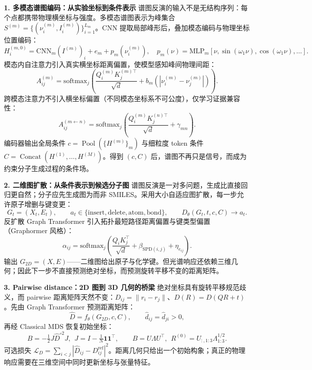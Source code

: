 \documentclass[10pt,a4paper]{ctexart}
\begin{document}
\textbf{1. 多模态谱图编码：从实验坐标到条件表示} \quad
谱图反演的输入不是无结构序列：每个点都携带物理横坐标与强度。多模态谱图表示为峰集合 $S^{(m)}=\{(\nu_i^{(m)},I_i^{(m)})\}_{i=1}^{L_m}$。CNN 提取局部峰形后，叠加模态编码与物理坐标位置编码：
\[
H_i^{(m,0)} = \mathrm{CNN}_m(I^{(m)})_i + e_m + p_m(\nu_i^{(m)}),\quad
p_m(\nu) = \mathrm{MLP}_m[\nu,\sin(\omega_1\nu),\cos(\omega_1\nu),\ldots].
\]
模态内自注意力引入真实横坐标距离偏置，使模型感知峰间物理间距：
\[
A_{ij}^{(m)} = \mathrm{softmax}_j\!\left(\frac{Q_i^{(m)}K_j^{(m)\top}}{\sqrt d} + b_m(|\nu_i^{(m)}-\nu_j^{(m)}|)\right).
\]
跨模态注意力不引入横坐标偏置（不同模态坐标系不可公度），仅学习证据兼容性：
\[
A_{ij}^{(m\leftarrow n)} = \mathrm{softmax}_j\!\left(\frac{Q_i^{(m)}K_j^{(n)\top}}{\sqrt d} + \gamma_{mn}\right).
\]
编码器输出全局条件 $c = \operatorname{Pool}(\{H^{(m)}\}_m)$ 与细粒度 token 条件 $C = \operatorname{Concat}(H^{(1)},\ldots,H^{(M)})$。得到 $(c,C)$ 后，谱图不再只是信号，而成为约束分子生成过程的条件场。

\textbf{2. 二维图扩散：从条件表示到候选分子图} \quad
谱图反演是一对多问题，生成比直接回归更自然；分子应先生成图为而非 SMILES。采用大小自适应图扩散，每一步允许原子增删与键变更：
\[
G_t = (X_t, E_t),\qquad a_t \in \{\mathrm{insert},\mathrm{delete},\mathrm{atom},\mathrm{bond}\},\qquad
D_\theta(G_t, t, c, C) \rightarrow a_t.
\]
反扩散 Graph Transformer 引入拓扑最短路径距离偏置与键类型偏置（Graphormer 风格）：
\[
\alpha_{ij} = \mathrm{softmax}_j\!\left(\frac{Q_iK_j^\top}{\sqrt d} + \beta_{\mathrm{SPD}(i,j)} + \eta_{e_{ij}}\right).
\]
输出 $G_{2D}=(X,E)$——二维图给出原子与化学键。但光谱响应还依赖三维几何；因此下一步不直接预测绝对坐标，而预测旋转平移不变的距离矩阵。

\textbf{3. Pairwise distance：2D 图到 3D 几何的桥梁} \quad
绝对坐标具有旋转平移规范歧义，而 pairwise 距离矩阵天然不变：$D_{ij}=\|r_i-r_j\|$、$D(R)=D(QR+t)$。先由 Graph Transformer 预测距离矩阵：
\[
\hat D = f_\theta(G_{2D}, c, C),\qquad \hat d_{ij} = \hat d_{ji} > 0,
\]
再经 Classical MDS 恢复初始坐标：
\[
B = -\tfrac12 J \hat D^{\circ 2} J,\ \ J = I - \tfrac1N \mathbf 1 \mathbf 1^\top,\qquad
B = U \Lambda U^\top,\ \ R^{(0)} = U_{:,1:3} \Lambda_{1:3}^{1/2}.
\]
可选损失 $\mathcal L_D = \sum_{i<j} |\hat D_{ij} - D_{ij}^{\mathrm{ref}}|^2$。距离几何只给出一个初始构象；真正的物理响应需要在三维空间中同时更新坐标与张量特征。
\end{document}
